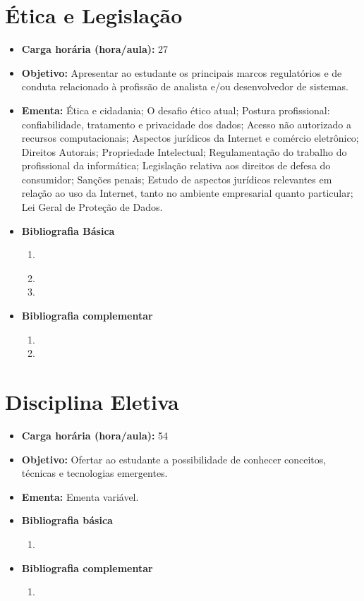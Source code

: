 \documentclass[11pt,fleqn]{book} %
\begin{document}
\section{Ética e Legislação}\label{5_etica}
\begin{itemize}
	\item \textbf{Carga horária (hora/aula):} 27
	\item \textbf{Objetivo:} Apresentar ao estudante os principais marcos regulatórios e de conduta relacionado à profissão de analista e/ou desenvolvedor de sistemas.
	\item \textbf{Ementa:}
	Ética e cidadania;
	O desafio ético atual;
	Postura profissional: confiabilidade, tratamento e privacidade dos dados;
	Acesso não autorizado a recursos computacionais;
	Aspectos jurídicos da Internet e comércio eletrônico; 
	Direitos Autorais;
	Propriedade Intelectual;
	Regulamentação do trabalho do profissional da informática;
	Legislação relativa aos direitos de defesa do consumidor;
	Sanções penais;
	Estudo de aspectos jurídicos relevantes em relação ao uso da Internet, tanto no ambiente empresarial quanto particular;
	Lei Geral de Proteção de Dados.
	\item \textbf{Bibliografia Básica}
	\begin{enumerate}
		\item \cite{cartilha2012}
		\item 
		\item 
	\end{enumerate}
	\item \textbf{Bibliografia complementar}
	\begin{enumerate}
		\item 
		\item
	\end{enumerate} 	
\end{itemize}

\newpage
\section{Disciplina Eletiva}\label{5_opt}
\begin{itemize}
	\item \textbf{Carga horária (hora/aula):} 54
	\item \textbf{Objetivo:} Ofertar ao estudante a possibilidade de conhecer conceitos, técnicas e tecnologias emergentes.
	\item \textbf{Ementa:} 
	Ementa variável.
	\item \textbf{Bibliografia básica}
	\begin{enumerate}
		\item 
	\end{enumerate}
	\item \textbf{Bibliografia complementar}
	\begin{enumerate}
		\item 	
	\end{enumerate}	
\end{itemize}
\end{document}
